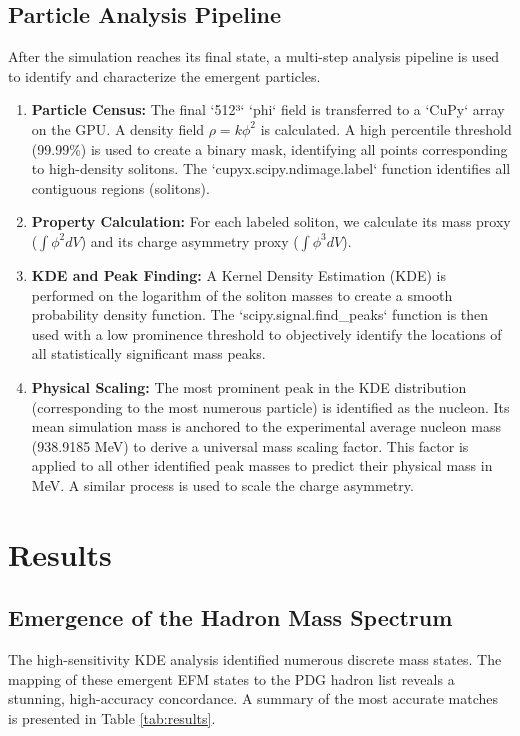 \documentclass[11pt]{article}
\begin{document}
\subsection{Particle Analysis Pipeline}
After the simulation reaches its final state, a multi-step analysis pipeline is used to identify and characterize the emergent particles.

\begin{enumerate}
    \item \textbf{Particle Census:} The final `512³` `phi` field is transferred to a `CuPy` array on the GPU. A density field \(\rho = k\phi^2\) is calculated. A high percentile threshold (99.99\%) is used to create a binary mask, identifying all points corresponding to high-density solitons. The `cupyx.scipy.ndimage.label` function identifies all contiguous regions (solitons).
    \item \textbf{Property Calculation:} For each labeled soliton, we calculate its mass proxy (\(\int \phi^2 dV\)) and its charge asymmetry proxy (\(\int \phi^3 dV\)).
    \item \textbf{KDE and Peak Finding:} A Kernel Density Estimation (KDE) is performed on the logarithm of the soliton masses to create a smooth probability density function. The `scipy.signal.find_peaks` function is then used with a low prominence threshold to objectively identify the locations of all statistically significant mass peaks.
    \item \textbf{Physical Scaling:} The most prominent peak in the KDE distribution (corresponding to the most numerous particle) is identified as the nucleon. Its mean simulation mass is anchored to the experimental average nucleon mass (938.9185 MeV) to derive a universal mass scaling factor. This factor is applied to all other identified peak masses to predict their physical mass in MeV. A similar process is used to scale the charge asymmetry.
\end{enumerate}

\section{Results}
\subsection{Emergence of the Hadron Mass Spectrum}
The high-sensitivity KDE analysis identified numerous discrete mass states. The mapping of these emergent EFM states to the PDG hadron list reveals a stunning, high-accuracy concordance. A summary of the most accurate matches is presented in Table \ref{tab:results}.
\end{document}
